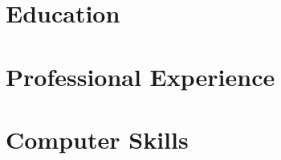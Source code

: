 \documentclass{moderncv}
\begin{document}
    

    \section{Education}
        

    \section{Professional Experience}
    	
        
    	
    	
    \section{Computer Skills}
    	
\end{document}
